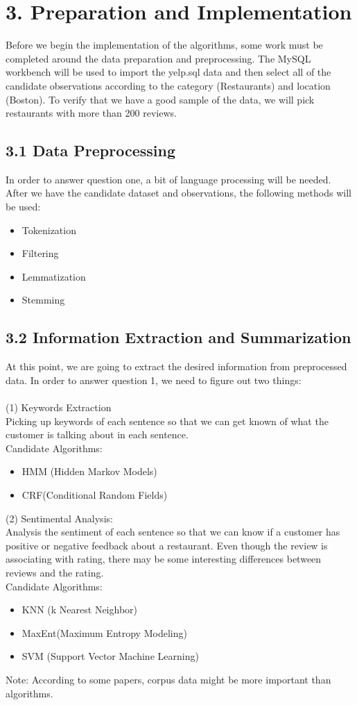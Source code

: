 \documentclass{neu_handout}
\begin{document}
\section*{3. Preparation and Implementation}
Before we begin the implementation of the algorithms, some work must be completed around the data preparation and preprocessing. The MySQL workbench will be used to import the yelp.sql data and then select all of the candidate observations according to the category (Restaurants) and location (Boston). To verify that we have a good sample of the data, we will pick restaurants with more than 200 reviews. \\

\subsection*{3.1 Data Preprocessing}
In order to answer question one, a bit of language processing will be needed. After we have the candidate dataset and observations, the following methods will be used:
\begin{itemize}
	\item Tokenization
	\item Filtering 
	\item Lemmatization
	\item Stemming
\end{itemize}

\subsection*{3.2 Information Extraction and Summarization}
At this point, we are going to extract the desired information from preprocessed data. In order to answer question 1, we need to figure out two things:\\\\
(1) Keywords Extraction\\
Picking up keywords of each sentence so that we can get known of what the customer is talking about in each sentence. \\
Candidate Algorithms:
\begin{itemize}
	\item HMM (Hidden Markov Models)
	\item CRF(Conditional Random Fields)
\end{itemize}

(2) Sentimental Analysis:\\
Analysis the sentiment of each sentence so that we can know if a customer has positive or negative feedback about a restaurant. Even though the review is associating with rating, there may be some interesting differences between reviews and the rating. \\
Candidate Algorithms: 
\begin{itemize}
	\item KNN (k Nearest Neighbor)
	\item MaxEnt(Maximum Entropy Modeling)
	\item SVM (Support Vector Machine Learning)
\end{itemize}
Note: According to some papers, corpus data might be more important than algorithms.\\\\
\end{document}
